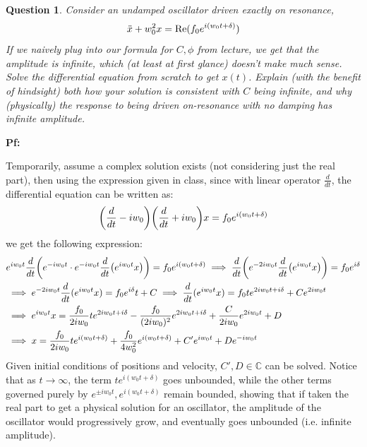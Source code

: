 \documentclass{article}
\newtheorem{question}{Question}
\newcommand{\CC}{\mathbb{C}}
\DeclarePairedDelimiter{\paran}{(}{)}%
\newcommand{\Real}{\textmd{Re}}
\begin{document}
\break

\section{}
\begin{question}\label{q5}
    Consider an \emph{undamped oscillator} driven exactly on resonance,
    $$\ddot x+w_0^2 x=\Real(f_0e^{i(w_0t+\delta)})$$
    If we naively plug into our formula for $C,\phi$ from lecture, we get that the amplitude is infinite, which (at least at first glance) doesn't make much sense. Solve the differential equation from scratch to get $x(t)$. Explain (with the benefit of hindsight) both how your solution is consistent with $C$ being infinite, and why (physically) the response to being driven on-resonance with no damping has infinite amplitude.
\end{question}

\textbf{Pf:}

Temporarily, assume a complex solution exists (not considering just the real part), then using the expression given in class, since with linear operator $\frac{d}{dt}$, the differential equation can be written as:
\begin{equation}
    \paran*{\frac{d}{dt}-iw_0}\paran*{\frac{d}{dt}+iw_0}x = f_0e^{i(w_0t+\delta)}
\end{equation}
 we get the following expression:
\begin{align}
    &e^{iw_0t}\frac{d}{dt}\paran*{e^{-iw_0t}\cdot e^{-iw_0t}\frac{d}{dt}\paran*{e^{iw_0t}x}}=f_0e^{i(w_0t+\delta)}\implies \frac{d}{dt}\paran*{e^{-2iw_0t}\frac{d}{dt}\paran*{e^{iw_0t}x}} = f_0e^{i\delta}\\
    &\implies e^{-2iw_0t}\frac{d}{dt}(e^{iw_0t}x) = f_0e^{i\delta}t+C \implies \frac{d}{dt}(e^{iw_0t}x) = f_0te^{2iw_0t+i\delta}+Ce^{2iw_0t}\\
    &\implies e^{iw_0t}x = \frac{f_0}{2iw_0}te^{2iw_0t+i\delta} - \frac{f_0}{(2iw_0)^2}e^{2iw_0t+i\delta}+\frac{C}{2iw_0}e^{2iw_0t}+D\\
    &\implies x = \frac{f_0}{2iw_0}te^{i(w_0t+\delta)}+\frac{f_0}{4w_0^2}e^{i(w_0t+\delta)} + C'e^{iw_0t}+De^{-iw_0t}
\end{align}
Given initial conditions of positions and velocity, $C',D\in \CC$ can be solved. Notice that as $t\rightarrow\infty$, the term $te^{i(w_0t+\delta)}$ goes unbounded, while the other terms governed purely by $e^{\pm iw_0t}, e^{i(w_0t+\delta)}$ remain bounded, showing that if taken the real part to get a physical solution for an oscillator, the amplitude of the oscillator would progressively grow, and eventually goes unbounded (i.e. infinite amplitude). 
\end{document}
